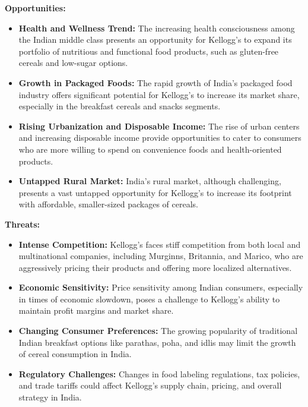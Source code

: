 \documentclass[10pt,a4paper]{book}
\begin{document}
\vspace{0.5cm}

\textbf{Opportunities:}
\begin{itemize}
    \item \textbf{Health and Wellness Trend:} The increasing health consciousness among the Indian middle class presents an opportunity for Kellogg’s to expand its portfolio of nutritious and functional food products, such as gluten-free cereals and low-sugar options.
    \item \textbf{Growth in Packaged Foods:} The rapid growth of India’s packaged food industry offers significant potential for Kellogg’s to increase its market share, especially in the breakfast cereals and snacks segments.
    \item \textbf{Rising Urbanization and Disposable Income:} The rise of urban centers and increasing disposable income provide opportunities to cater to consumers who are more willing to spend on convenience foods and health-oriented products.
    \item \textbf{Untapped Rural Market:} India’s rural market, although challenging, presents a vast untapped opportunity for Kellogg’s to increase its footprint with affordable, smaller-sized packages of cereals.
\end{itemize}

\vspace{0.5cm}

\textbf{Threats:}
\begin{itemize}
    \item \textbf{Intense Competition:} Kellogg’s faces stiff competition from both local and multinational companies, including Murginns, Britannia, and Marico, who are aggressively pricing their products and offering more localized alternatives.
    \item \textbf{Economic Sensitivity:} Price sensitivity among Indian consumers, especially in times of economic slowdown, poses a challenge to Kellogg’s ability to maintain profit margins and market share.
    \item \textbf{Changing Consumer Preferences:} The growing popularity of traditional Indian breakfast options like parathas, poha, and idlis may limit the growth of cereal consumption in India.
    \item \textbf{Regulatory Challenges:} Changes in food labeling regulations, tax policies, and trade tariffs could affect Kellogg’s supply chain, pricing, and overall strategy in India.
\end{itemize}
\end{document}
